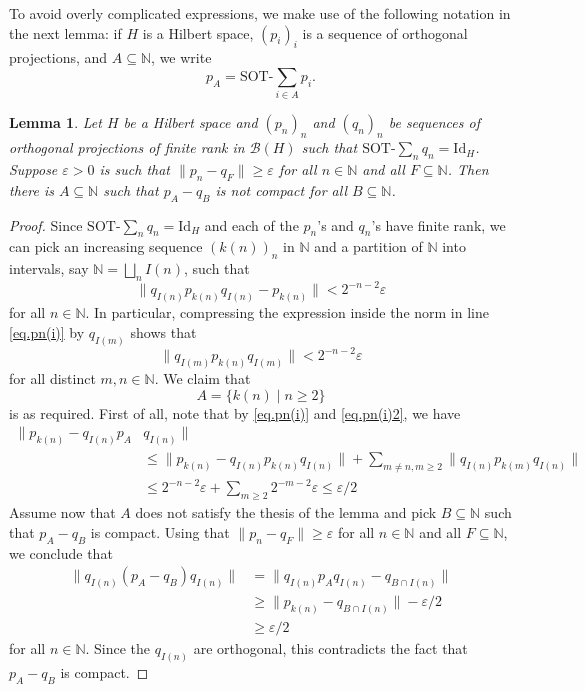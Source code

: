 \documentclass[11pt]{amsart}
\newcommand{\N}{\mathbb{N}}
\newcommand{\eps}{\varepsilon}
\newcommand{\SOTh}{\mathrm{SOT}\text{-}}
\newcommand{\bbN}{\mathbb{N}}
\newcommand{\cB}{\mathcal{B}}
\numberwithin{equation}{section}
\newtheorem{lemma}[theorem]{Lemma}
\theoremstyle{definition}
\theoremstyle{remark}
\numberwithin{equation}{section}
\begin{document}
To avoid overly complicated expressions, we make use of the following notation in the next lemma: if $H$ is a Hilbert space, $(p_i)_i$ is a sequence of orthogonal projections, and $A\subseteq \bbN$, we write 
\[
p_A=\SOTh\sum_{i\in A} p_i.
\]

\begin{lemma}\label{L.piqi}
	Let $H$ be a Hilbert space and $(p_n)_n$ and $(q_n)_n$ be sequences of orthogonal projections of finite rank in $\cB(H)$ such that $\SOTh\sum_n q_n=\mathrm{Id}_H$. Suppose $\eps>0$ is such that $\|p_n-q_F\|\geq \varepsilon$ for all $n\in\N$ and all $F\subseteq \N$. 
	Then there is $A\subseteq \bbN$ such that $p_A-q_B$ is not compact for all $B\subseteq \bbN$. 
\end{lemma}

\begin{proof} 
Since $\SOTh\sum_n q_n=\mathrm{Id}_H$ and each of the $p_n$'s and $q_n$'s have finite rank, we can pick an increasing sequence $(k(n))_n$ in $ \bbN$ and a partition of $\bbN$ into intervals, say $\bbN=\bigsqcup_n I(n)$, such that 
	\begin{equation}\label{eq.pn(i)}
	\|q_{I(n)}p_{k(n)}q_{I(n)}-p_{k(n)}\|<2^{-n-2}\eps
	\end{equation}
 for all $n\in\N$. In particular, compressing the expression inside the norm in line \eqref{eq.pn(i)} by $q_{I(m)}$ shows that
 \begin{equation}\label{eq.pn(i)2}
\|q_{I(m)}p_{k(n)}q_{I(m)}\|<2^{-n-2}\eps
\end{equation}
for all distinct $m,n\in\N$. We claim that 
 \[
 A=\{k(n)\mid n\geq 2\}
 \] 
 is as required. First of all, note that by \eqref{eq.pn(i)} and \eqref{eq.pn(i)2}, we have 
\begin{align*}
\|p_{k(n)}-q_{I(n)}p_A & q_{I(n)}\|\\
&\leq \|p_{k(n)}-q_{I(n)}p_{k(n)}q_{I(n)}\|+\sum_{m\neq n, m\geq 2}\|q_{I(n)}p_{k(m)}q_{I(n)}\|\\
&\leq 2^{-n-2}\eps+\sum_{m\geq 2}2^{-m-2}\eps\leq\eps/2
\end{align*}
 Assume now that $A$ does not satisfy the thesis of the lemma and pick $B\subseteq \bbN$ such that $p_A-q_B$ is compact. Using that $\|p_n-q_F\|\geq \varepsilon$ for all $n\in\N$ and all $F\subseteq \N$, we conclude that 
	\begin{align*}
	\|q_{I(n)} (p_A-q_B) q_{I(n)}\|&= 	\|q_{I(n)} p_Aq_{I(n)} -q_{B\cap I(n)}\|\\
& \geq \|p_{k(n)}-q_{B\cap I(n)}\|-\eps/2\\
 &\geq\eps/2
	\end{align*}
for all $n\in\N$. Since the $q_{I(n)}$ are orthogonal,  this contradicts the fact that $p_A-q_B$ is compact. 
\end{proof}
	
\end{document}
